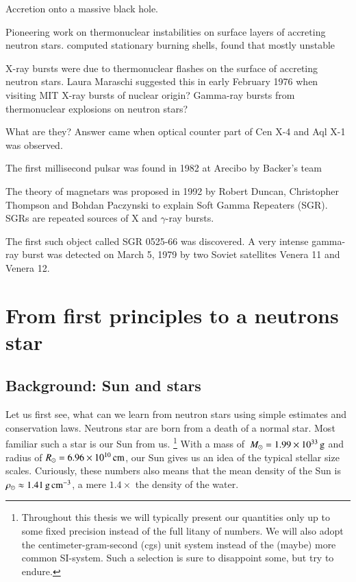 Accretion onto a massive black hole.


Pioneering work on thermonuclear instabilities on surface layers of accreting neutron stars. \cite{HvH75}
computed stationary burning shells, found that mostly unstable

X-ray bursts were due to thermonuclear flashes on the surface of accreting neutron stars.
Laura Maraschi suggested this in early February 1976 when visiting MIT 
X-ray bursts of nuclear origin? \cite{MC77}
Gamma-ray bursts from thermonuclear explosions on neutron stars? \cite{WT76}



What are they? Answer came when optical counter part of Cen X-4 \cite{vPV80} and Aql X-1 \cite{TCB78} was observed.



The first millisecond pulsar was found in 1982 at Arecibo by Backer’s team

The theory of magnetars was proposed in 1992 by Robert Duncan, Christopher Thompson and Bohdan Paczynski to explain Soft Gamma Repeaters (SGR). SGRs are repeated sources of X and $\gamma$-ray bursts. \cite{DT92}

The first such object called SGR 0525-66 was discovered.
A very intense gamma-ray burst was detected on March 5, 1979 by two Soviet satellites Venera 11 and Venera 12.\cite{MGI79}



\section{From first principles to a neutrons star}

\subsection{Background: Sun and stars}
Let us first see, what can we learn from neutron stars using simple estimates and conservation laws.
Neutrons star are born from a death of a normal star.%
Most familiar such a star is our Sun  \cm from us.%
\footnote{Throughout this thesis we will typically present our quantities only up to some fixed precision instead of the full litany of numbers.
We will also adopt the centimeter-gram-second (cgs) unit system instead of the (maybe) more common SI-system. 
Such a selection is sure to disappoint some, but try to endure.
}
With a mass of $\, M_{\odot} = 1.99 \times 10^{33} \, \mathrm{g}$ and radius of $R_{\odot} = 6.96 \times 10^{10} \, \mathrm{cm}$, our Sun gives us an idea of the typical stellar size scales.
Curiously, these numbers also means that the mean density of the Sun is $\rho_{\odot} \approx 1.41 \, \mathrm{g}\,\mathrm{cm}^{-3} $, a mere $1.4\times$ the density of the water.

